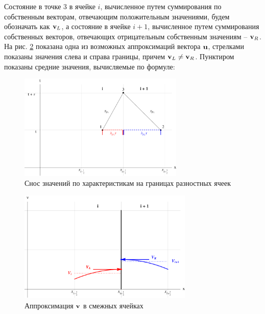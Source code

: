 \documentclass[12pt,a4paper]{article}
\newcommand{\picref}[1]{рис. \ref{#1}}
\begin{document}
    Состояние в точке $3$ в ячейке $ i $, вычисленное путем суммирования по собственным векторам, отвечающим положительным значениями, будем обозначать как $\bold v_L$, а состояние в ячейке $ i + 1 $, вычисленное путем суммирования собственных векторов, отвечающих отрицательным собственным значениям -- $ \bold v_R $. На \picref{fig:approx} показана одна из возможных аппроксимаций вектора $ \bold u $, стрелками показаны значения слева и справа границы, причем $ \bold v_L \neq \bold v_R $. Пунктиром показаны средние значения, вычисляемые по формуле:

    \pagebreak

    \begin{figure}[h]
        \centering
        \includegraphics[width=0.7\textwidth]{visualization.pdf}
        \caption{Снос значений по характеристикам на границах разностных ячеек}
        \label{fig:visualization}
    \end{figure}

    \vskip 3cm

    \begin{figure}[h]
        \centering
        \includegraphics[width=0.74\textwidth]{approximation.pdf}
        \caption{Аппроксимация $\bold v$ в смежных ячейках}
        \label{fig:approx}
    \end{figure}
\end{document}
